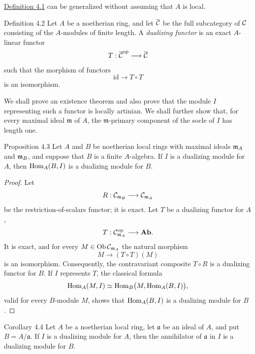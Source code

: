 \hyperref[IV.4.1]{Definition 4.1} can be generalized without assuming that $A$ is local.

\begin{sgastatement}{Definition 4.2}
Let $A$ be a noetherian ring, and let $\overline{\mathcal C}$ be the full subcategory of
$\mathcal C$ consisting of the $A$-modules of finite length. A
\emph{dualizing functor} is an exact $A$-linear functor
\[
  T:\overline{\mathcal C}^{\mathrm{op}}\longrightarrow\overline{\mathcal C}
\]
such that the morphism of functors
\[
  \mathrm{id}\longrightarrow T\circ T
\]
is an isomorphism.
\end{sgastatement}

We shall prove an existence theorem and also prove that the module $I$
representing such a functor is locally artinian. We shall further show
that, for every maximal ideal $\mathfrak m$ of $A$, the
$\mathfrak m$-primary component of the socle of $I$ has length one.


\begin{sgastatement}{Proposition 4.3}
Let $A$ and $B$ be noetherian local rings with maximal ideals
$\mathfrak m_A$ and $\mathfrak m_B$, and suppose that $B$ is a finite $A$-algebra. If $I$
is a dualizing module for $A$, then $\operatorname{Hom}_A(B,I)$ is a dualizing
module for $B$.
\end{sgastatement}

\begin{proof}
Let
\[
  R:\mathcal C_{\mathfrak m_B}\longrightarrow\mathcal C_{\mathfrak m_A}
\]
be the restriction-of-scalars functor; it is exact. Let $T$ be a
dualizing functor for $A$,
\[
  T:\mathcal C_{\mathfrak m_A}^{\mathrm{op}}\longrightarrow\mathbf{Ab}.
\]
It is exact, and for every $M\in\operatorname{Ob}\mathcal C_{\mathfrak m_A}$ the
natural morphism
\[
  M\longrightarrow (T\circ T)(M)
\]
is an isomorphism. Consequently, the contravariant composite $T\circ R$
is a dualizing functor for $B$. If $I$ represents $T$, the classical
formula
\[
  \operatorname{Hom}_A(M,I)\simeq
  \operatorname{Hom}_B\bigl(M,\operatorname{Hom}_A(B,I)\bigr),
\]
valid for every $B$-module $M$, shows that $\operatorname{Hom}_A(B,I)$ is a
dualizing module for $B$.
\end{proof}

\begin{sgastatement}{Corollary 4.4}
Let $A$ be a noetherian local ring, let $\mathfrak a$ be an ideal of
$A$, and put $B=A/\mathfrak a$. If $I$ is a dualizing module for $A$,
then the annihilator of $\mathfrak a$ in $I$ is a dualizing module for
$B$.
\end{sgastatement}

